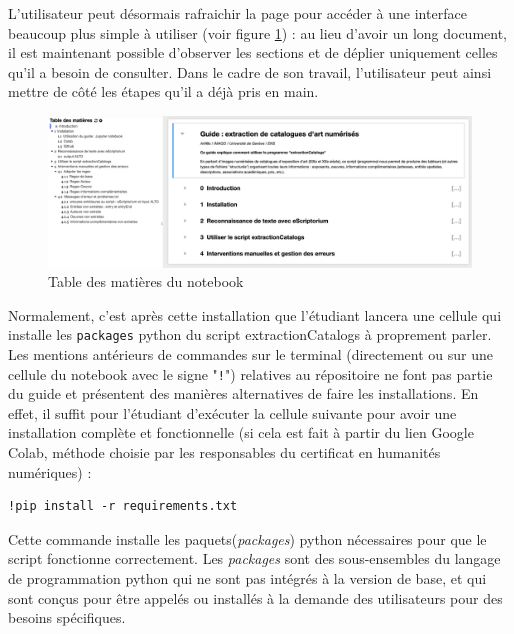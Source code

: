 \documentclass[a4paper,12pt,twoside]{book}
\begin{document}
L'utilisateur peut désormais rafraichir la page pour accéder à une interface beaucoup plus simple à utiliser (voir figure \ref{interfacenb}) : au lieu d'avoir un long document, il est maintenant possible d'observer les sections et de déplier uniquement celles qu'il a besoin de consulter. Dans le cadre de son travail, l'utilisateur peut ainsi mettre de côté les étapes qu'il a déjà pris en main. 

\begin{figure}[ht]
	\centering
	\includegraphics[scale=0.2]{menu_guide.png}		
	\caption{Table des matières du notebook}
	\label{interfacenb}
\end{figure}

Normalement, c'est après cette installation que l'étudiant lancera une cellule qui installe les \texttt{packages} python du script extractionCatalogs à proprement parler. Les mentions antérieurs de commandes sur le terminal (directement ou sur une cellule du notebook avec le signe "\texttt{!}") relatives au répositoire ne font pas partie du guide et présentent des manières alternatives de faire les installations. En effet, il suffit pour l'étudiant d'exécuter la cellule suivante pour avoir une installation complète et fonctionnelle (si cela est fait à partir du lien Google Colab, méthode choisie par les responsables du certificat en humanités numériques) : 

\begin{normalsize}
	\begin{verbatim}
!pip install -r requirements.txt
	\end{verbatim}
\end{normalsize}

Cette commande installe les paquets(\textit{packages}) python nécessaires pour que le script fonctionne correctement. Les \textit{packages} sont des sous-ensembles du langage de programmation python qui ne sont pas intégrés à la version de base, et qui sont conçus pour être appelés ou installés à la demande des utilisateurs pour des besoins spécifiques.
\end{document}

